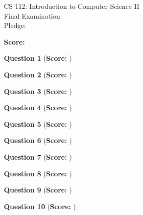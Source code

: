 \documentclass[epsf,psfig, 12pt]{article}
\begin{document}
\pagestyle{empty}


\vspace*{3in}

\begin{center}

CS 112: Introduction to Computer Science II \\
Final Examination \\
Pledge: \\

\vspace*{1in}

{\large 

{\bf Score:} \underline{\hspace*{.2in}} \hspace*{.05in}

}

\end{center}

\newpage

{\bf Question 1} ({\bf Score:} \underline{\hspace*{.2in}} \hspace*{.05in})

\newpage

{\bf Question 2} ({\bf Score:} \underline{\hspace*{.2in}} \hspace*{.05in})

\newpage

{\bf Question 3} ({\bf Score:} \underline{\hspace*{.2in}} \hspace*{.05in})

\newpage

{\bf Question 4} ({\bf Score:} \underline{\hspace*{.2in}} \hspace*{.05in})

\newpage

{\bf Question 5} ({\bf Score:} \underline{\hspace*{.2in}} \hspace*{.05in})

\newpage

{\bf Question 6} ({\bf Score:} \underline{\hspace*{.2in}} \hspace*{.05in})

\newpage

{\bf Question 7} ({\bf Score:} \underline{\hspace*{.2in}} \hspace*{.05in})

\newpage

{\bf Question 8} ({\bf Score:} \underline{\hspace*{.2in}} \hspace*{.05in})

\newpage

{\bf Question 9} ({\bf Score:} \underline{\hspace*{.2in}} \hspace*{.05in})

\newpage

{\bf Question 10} ({\bf Score:} \underline{\hspace*{.2in}} \hspace*{.05in})

\newpage
\end{document}
